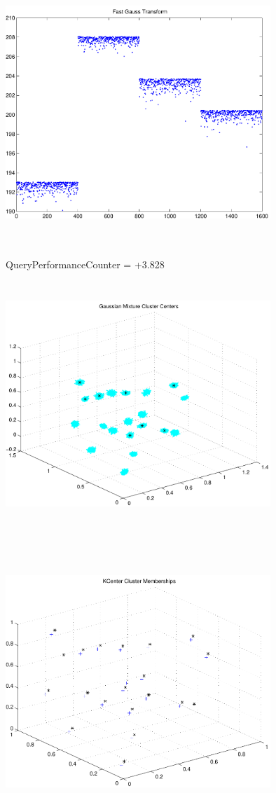 \documentclass[9pt]{article}
\theoremstyle{plain}
\theoremstyle{definition}
\theoremstyle{remark}
\numberwithin{equation}{section}
\begin{document}
\includegraphics[width=10.0cm,height=10.0cm]{FGT4_Centers.pdf}

QueryPerformanceCounter  =  +3.828
\includegraphics[width=10.0cm,height=10.0cm]{GaussianMixture_ClusterCenters20_Centers.pdf}

\includegraphics[width=10.0cm,height=10.0cm]{KCenterClusterMemberships_20_Centers.pdf}
\end{document}
